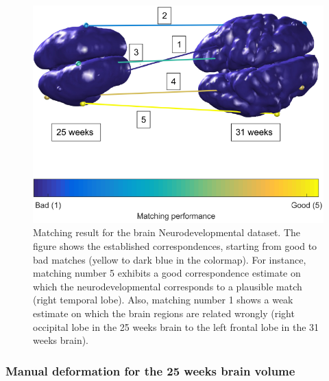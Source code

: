 \documentclass[]{article}
\begin{document}
\begin{figure}[ht!]
	\centering
	
	\includegraphics[width=0.8\linewidth]{img/brainBabyMatch2v}
	\caption{Matching result for the brain Neurodevelopmental dataset.  The figure shows the established correspondences, starting from good to bad matches (yellow to dark blue in the colormap). For instance, matching number 5 exhibits a good correspondence estimate on which the neurodevelopmental corresponds to a plausible match  (right temporal lobe). Also, matching number 1 shows a weak estimate on which the brain regions are related wrongly (right occipital lobe in the 25 weeks brain to the left frontal lobe in the 31 weeks brain). }
	\label{fig:brainBabyM}
\end{figure}

\subsubsection{Manual deformation for the 25 weeks brain volume}
\end{document}
